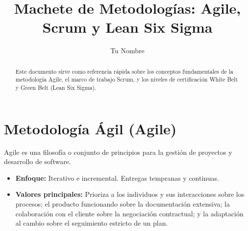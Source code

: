 \documentclass{llncs}
\begin{document}
\title{Machete de Metodologías: Agile, Scrum y Lean Six Sigma}
\author{Tu Nombre}

\maketitle

\begin{abstract}
Este documento sirve como referencia rápida sobre los conceptos fundamentales de la metodología Agile, el marco de trabajo Scrum, y los niveles de certificación White Belt y Green Belt (Lean Six Sigma).
\end{abstract}

\section{Metodología Ágil (Agile)}
Agile es una filosofía o conjunto de principios para la gestión de proyectos y desarrollo de software.
\begin{itemize}
    \item \textbf{Enfoque:} Iterativo e incremental. Entregas tempranas y continuas.
    \item \textbf{Valores principales:} Prioriza a los individuos y sus interacciones sobre los procesos; el producto funcionando sobre la documentación extensiva; la colaboración con el cliente sobre la negociación contractual; y la adaptación al cambio sobre el seguimiento estricto de un plan.
\end{itemize}
\end{document}
